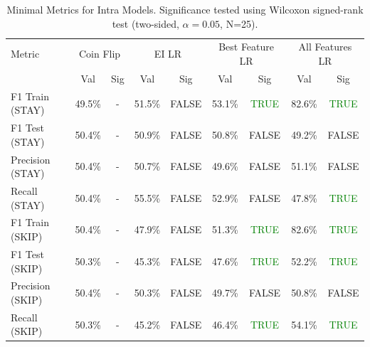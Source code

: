 \begin{table}[ht]
\centering
\begin{tabular}{lcccccccc}
\hline
Metric & \multicolumn{2}{c}{Coin Flip} & \multicolumn{2}{c}{EI LR} & \multicolumn{2}{c}{Best Feature LR} & \multicolumn{2}{c}{All Features LR} \\
 & Val & Sig & Val & Sig & Val & Sig & Val & Sig \\
\hline
F1 Train (STAY) & 49.5\% & - & 51.5\% & FALSE & 53.1\% & \textcolor{green}{TRUE} & 82.6\% & \textcolor{green}{TRUE} \\
F1 Test (STAY) & 50.4\% & - & 50.9\% & FALSE & 50.8\% & FALSE & 49.2\% & FALSE \\
Precision (STAY) & 50.4\% & - & 50.7\% & FALSE & 49.6\% & FALSE & 51.1\% & FALSE \\
Recall (STAY) & 50.4\% & - & 55.5\% & FALSE & 52.9\% & FALSE & 47.8\% & \textcolor{green}{TRUE} \\
F1 Train (SKIP) & 50.4\% & - & 47.9\% & FALSE & 51.3\% & \textcolor{green}{TRUE} & 82.6\% & \textcolor{green}{TRUE} \\
F1 Test (SKIP) & 50.3\% & - & 45.3\% & FALSE & 47.6\% & \textcolor{green}{TRUE} & 52.2\% & \textcolor{green}{TRUE} \\
Precision (SKIP) & 50.4\% & - & 50.3\% & FALSE & 49.7\% & FALSE & 50.8\% & FALSE \\
Recall (SKIP) & 50.3\% & - & 45.2\% & FALSE & 46.4\% & \textcolor{green}{TRUE} & 54.1\% & \textcolor{green}{TRUE} \\
\hline
\end{tabular}
\caption{Minimal Metrics for Intra Models. Significance tested using Wilcoxon signed-rank test (two-sided, $\alpha=0.05$, N=25).}
\label{tab:metrics_intra}
\end{table}